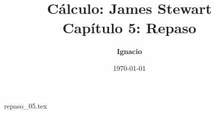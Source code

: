 \documentclass[11pt,spanish,oneside]{report}
\title{\textbf{Cálculo: James Stewart} \\ \Large Capítulo 5: Repaso}
\author{\textbf{Ignacio}}
\date{\today}
\begin{document}
\maketitle

{repaso_05.tex}
\end{document}
